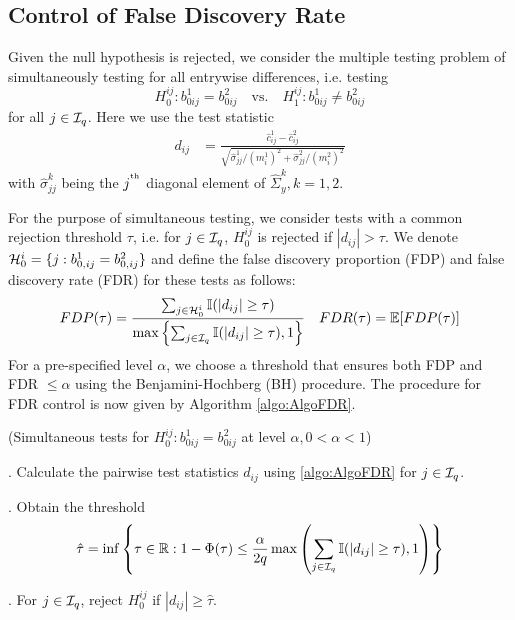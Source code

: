 \subsection{Control of False Discovery Rate}
Given the null hypothesis is rejected, we consider the multiple testing problem of simultaneously testing for all entrywise differences, i.e. testing
%
$$
H_0^{ij}: b_{0 ij}^1 = b_{0ij}^2 \quad \text{vs.} \quad H_1^{ij}: b_{0 ij}^1 \neq b_{0 ij}^2 
$$
%
for all $j \in {\cal{I}}_q$. Here we use the test statistic
%
\begin{align}\label{eqn:PairwiseStatistic}
d_{ij} &= \frac{\widehat c_{ij}^1 - \widehat c_{ij}^2}{\sqrt{\hat \sigma_{jj}^1/ (m_i^1)^2 + \hat \sigma_{jj}^2/ (m_i^2)^2}}
\end{align}
%
with $\hat \sigma_{jj}^k$ being the $j^{\operatorname*{^{\text{th}}}}$ diagonal element of $\widehat \Sigma_y^k, k = 1,2$.

For the purpose of simultaneous testing, we consider tests with a common rejection threshold $\tau$, i.e. for $j \in {\cal{I}}_q$, $H_0^{ij}$ is rejected if $| d_{ij} | > \tau$. We denote ${\cal{H}}_0^i = \{ j: b_{0,ij}^1 = b_{0,ij}^2 \}$ and define the false discovery proportion (FDP) and false discovery rate (FDR) for these tests as follows:
%
$$
FDP (\tau) = \frac{\sum_{j \in {\cal{H}}_0^i} {\mathbb{I}}( |d_{ij}| \geq \tau)}{\max\left\{
\sum_{j \in {\cal{I}}_q} {\mathbb{I}}( |d_{ij}| \geq \tau), 1\right\} }\quad
FDR (\tau) = {\mathbb{E}} [ FDP (\tau) ]
$$
%
For a pre-specified level $\alpha$, we choose a threshold that ensures both FDP and FDR $\leq \alpha$ using the Benjamini-Hochberg (BH) procedure. %
The procedure for FDR control is now given by Algorithm \ref{algo:AlgoFDR}.

\begin{Algorithm}\label{algo:AlgoFDR}
(Simultaneous tests for $H_0^{ij}: b_{0 ij}^1 = b_{0 ij}^2$ at level $\alpha, 0< \alpha< 1$)

. Calculate the pairwise test statistics $d_{ij}$ using \eqref{algo:AlgoFDR} for $j \in {\cal{I}}_q$.

. Obtain the threshold
%
$$
\hat \tau = \inf \left\{\tau \in {\mathbb{R}}: 1 - \Phi(\tau) \leq \frac{\alpha}{2 q}
\max \left( \sum_{j \in {\cal{I}}_q} {\mathbb{I}}( |d_{ij}| \geq \tau), 1 \right) \right\}
$$
%

. For $j \in {\cal{I}}_q$, reject $H_0^{ij}$ if $|d_{ij}| \geq \hat \tau$.
\end{Algorithm}

